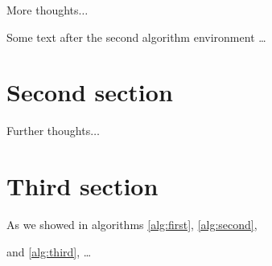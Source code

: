 \documentclass[8pt]{article}   %
\begin{document}
\begin{theorem}
More thoughts$\ldots$ \label{alg:second}
\end{theorem}

Some text after the second algorithm environment \ldots

\section{Second section}

\begin{theorem}
Further thoughts$\ldots$ \label{alg:third}
\end{theorem}

\section{Third section}

As we showed in algorithms \ref{alg:first}, \ref{alg:second}, 

and \ref{alg:third}, \ldots 
\end{document}
